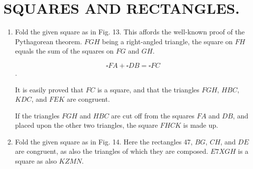 
\chapter{SQUARES AND RECTANGLES.}


\begin{enumerate}

    \item Fold the given square as in Fig. 13. This affords the well-known proof
        of the Pythagorean theorem.  $FGH$ being a right-angled triangle, the
        square on $FH$ equals the sum of the squares on $FG$ and $GH$.

        $$\square FA + \square DB = \square FC$$.

        It is easily proved that $FC$ is a square, and that the triangles $FGH$,
        $HBC$, $KDC$, and $FEK$ are congruent.

        If the triangles $FGH$ and $HBC$ are cut off from the squares $FA$ and
        $DB$, and placed upon the other two triangles, the square $FHCK$ is made
        up.


    \item Fold the given square as in Fig. 14. Here the rectangles 47, $BG$,
        $CH$, and $DE$ are congruent, as also the triangles of which they are
        composed.  $E7XGH$ is a square as also $KZMN$.

%
%
%
%
%
%
%
%
%
%
%
%
%


\end{enumerate}
